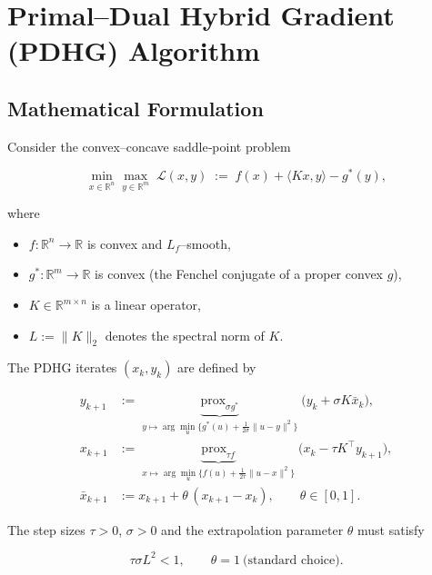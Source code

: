 \documentclass{article}
\begin{document}
\section*{Primal–Dual Hybrid Gradient (PDHG) Algorithm}

\subsection*{Mathematical Formulation}
Consider the convex–concave saddle‑point problem  

\[
\min_{x\in\mathbb{R}^n}\max_{y\in\mathbb{R}^m}
\; \mathcal L(x,y)\;:=\; f(x)+\langle Kx,y\rangle-g^{*}(y),
\tag{1}
\]

where  

\begin{itemize}
  \item $f:\mathbb{R}^n\to\mathbb{R}$ is convex and $L_f$–smooth,
  \item $g^{*}:\mathbb{R}^m\to\mathbb{R}$ is convex (the Fenchel conjugate of a proper convex $g$),
  \item $K\in\mathbb{R}^{m\times n}$ is a linear operator,
  \item $L:=\|K\|_2$ denotes the spectral norm of $K$.
\end{itemize}

The PDHG iterates $(x_k,y_k)$ are defined by  

\[
\begin{aligned}
y_{k+1} &:= \underbrace{\operatorname{prox}_{\sigma g^{*}}}_{\displaystyle
y\mapsto\arg\min_{u}\big\{g^{*}(u)+\tfrac{1}{2\sigma}\|u-y\|^{2}\big\}}
\!\!\bigl(y_k+\sigma K\bar x_k\bigr), \tag{2a}\\[4pt]
x_{k+1} &:= \underbrace{\operatorname{prox}_{\tau f}}_{\displaystyle
x\mapsto\arg\min_{u}\big\{f(u)+\tfrac{1}{2\tau}\|u-x\|^{2}\big\}}
\!\!\bigl(x_k-\tau K^{\!\top} y_{k+1}\bigr), \tag{2b}\\[4pt]
\bar x_{k+1} &:= x_{k+1}+ \theta\,(x_{k+1}-x_k), \qquad\theta\in[0,1]. \tag{2c}
\end{aligned}
\]

The step sizes $\tau>0$, $\sigma>0$ and the extrapolation parameter $\theta$ must satisfy  

\[
\tau\sigma L^{2}<1,\qquad \theta =1\ \text{(standard choice)}.
\tag{3}
\]
\end{document}
